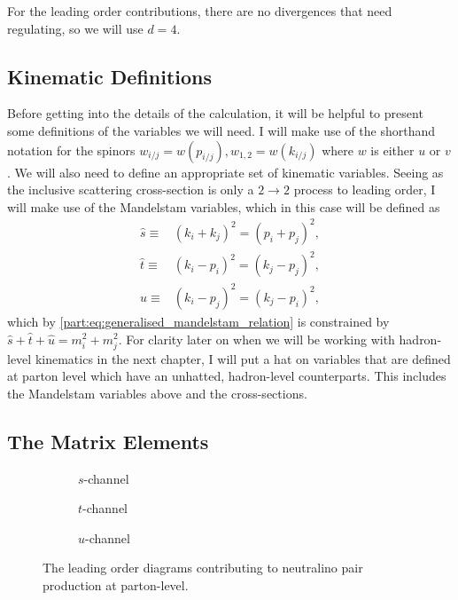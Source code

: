 \documentclass[../main.tex]{subfiles}
\begin{document}
For the leading order contributions, there are no divergences that need regulating, so we will use \(d=4\).

\subsection{Kinematic Definitions}
Before getting into the details of the calculation, it will be helpful to present some definitions of the variables we will need.
I will make use of the shorthand notation for the spinors \(w_{i/j} = w(p_{i/j}), w_{1,2} = w(k_{i/j})\) where \(w\) is either \(u\) or \(v\).
We will also need to define an appropriate set of kinematic variables.
Seeing as the inclusive scattering cross-section is only a \(2 \to 2\) process to leading order, I will make use of the Mandelstam variables, which in this case will be defined as
\begin{subequations}
  \label{part:eq:mandelstam_LO}
  \begin{align}
    \hat{s} \equiv & (k_i+k_j)^2 = (p_i+p_j)^2, \\
    \hat{t} \equiv & (k_i-p_i)^2 = (k_j-p_j)^2, \\
    \hat{u} \equiv & (k_i-p_j)^2 = (k_j-p_i)^2,
  \end{align}
\end{subequations}
which by \cref{part:eq:generalised_mandelstam_relation} is constrained by \(\hat{s} + \hat{t} + \hat{u} = m_i^2 + m_j^2\).
For clarity later on when we will be working with hadron-level kinematics in the next chapter, I will put a hat on variables that are defined at parton level which have an unhatted, hadron-level counterparts.
This includes the Mandelstam variables above and the cross-sections.


\subsection{The Matrix Elements}
\begin{figure} [ht!]
  \centering
  \begin{subfigure}{0.3\linewidth}
    \centering
    \caption{\(s\)-channel}
  \end{subfigure}
  \begin{subfigure}{0.3\linewidth}
    \centering
    \caption{\(t\)-channel}
  \end{subfigure}
  \begin{subfigure}{0.3\linewidth}
    \centering
    \caption{\(u\)-channel}
  \end{subfigure}
  \caption{The leading order diagrams contributing to neutralino pair
    production at parton-level.}
  \label{pc:fig:tree_level_diagrams}
\end{figure}
\end{document}
